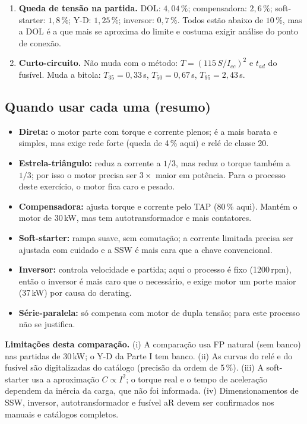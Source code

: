 \documentclass[11pt,a4paper]{article}
\begin{document}
\begin{enumerate}[leftmargin=1.4em]
\item \textbf{Queda de tens\~ao na partida.} DOL: $4{,}04\,\%$; compensadora: $2{,}6\,\%$; soft-starter: $1{,}8\,\%$; Y-D: $1{,}25\,\%$; inversor: $0{,}7\,\%$. Todos est\~ao abaixo de $10\,\%$, mas a DOL \'e a que mais se aproxima do limite e costuma exigir an\'alise do ponto de conex\~ao.
\item \textbf{Curto-circuito.} N\~ao muda com o m\'etodo: $T=(115\,S/I_{cc})^2$ e $t_{ad}$ do fus\'ivel. Muda a bitola: $T_{35}=0{,}33$\,s, $T_{50}=0{,}67$\,s, $T_{95}=2{,}43$\,s.
\end{enumerate}

\subsection{Quando usar cada uma (resumo)}
\begin{itemize}[leftmargin=1.2em]
\item \textbf{Direta:} o motor parte com torque e corrente plenos; \'e a mais barata e simples, mas exige rede forte (queda de 4\,\% aqui) e rel\'e de classe 20.
\item \textbf{Estrela-tri\^angulo:} reduz a corrente a $1/3$, mas reduz o torque tamb\'em a $1/3$; por isso o motor precisa ser $3\times$ maior em pot\^encia. Para o processo deste exerc\'icio, o motor fica caro e pesado.
\item \textbf{Compensadora:} ajusta torque e corrente pelo TAP (80\,\% aqui). Mant\'em o motor de 30\,kW, mas tem autotransformador e mais contatores.
\item \textbf{Soft-starter:} rampa suave, sem comuta\c{c}\~ao; a corrente limitada precisa ser ajustada com cuidado e a SSW \'e mais cara que a chave convencional.
\item \textbf{Inversor:} controla velocidade e partida; aqui o processo \'e fixo (1200\,rpm), ent\~ao o inversor \'e mais caro que o necess\'ario, e exige motor um porte maior (37\,kW) por causa do derating.
\item \textbf{S\'erie-paralela:} s\'o compensa com motor de dupla tens\~ao; para este processo n\~ao se justifica.
\end{itemize}

\textbf{Limita\c{c}\~oes desta compara\c{c}\~ao.} (i) A compara\c{c}\~ao usa FP natural (sem banco) nas partidas de 30\,kW; o Y-D da Parte I tem banco. (ii) As curvas do rel\'e e do fus\'ivel s\~ao digitalizadas do cat\'alogo (precis\~ao da ordem de 5\,\%). (iii) A soft-starter usa a aproxima\c{c}\~ao $C\propto I^2$; o torque real e o tempo de acelera\c{c}\~ao dependem da in\'ercia da carga, que n\~ao foi informada. (iv) Dimensionamentos de SSW, inversor, autotransformador e fus\'ivel aR devem ser confirmados nos manuais e cat\'alogos completos.
\end{document}
